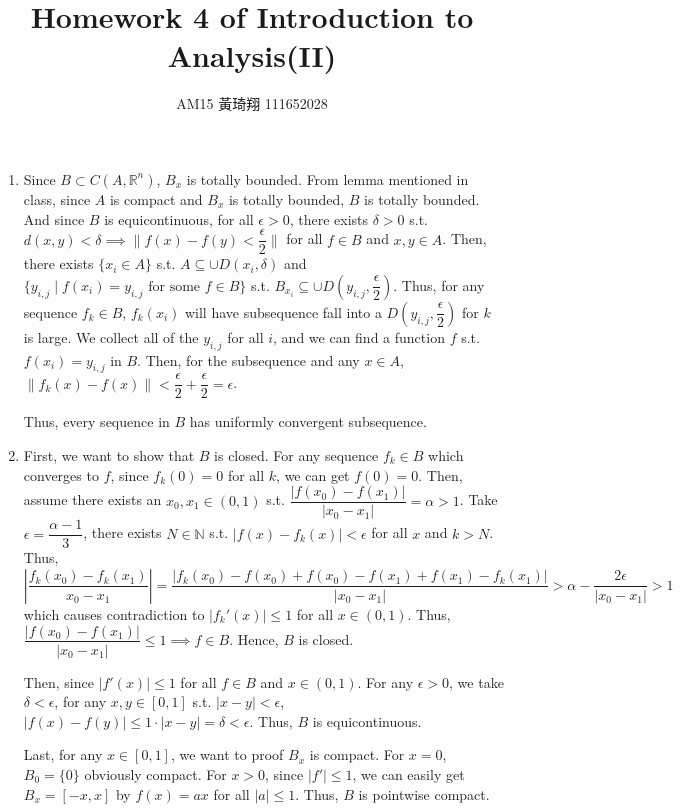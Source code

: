 \documentclass[12pt]{article}
\title{Homework 4 of Introduction to Analysis(II)}
\author{AM15 黃琦翔 111652028}
\begin{document}
\maketitle
\begin{enumerate}
    \item Since $B \subset C(A, \mathbb{R}^n)$, $B_x$ is totally bounded.
    From lemma mentioned in class, since $A$ is compact and $B_x$ is totally bounded, $B$ is totally bounded.
    And since $B$ is equicontinuous, for all $\epsilon> 0$, there exists $\delta > 0$ s.t. $d(x, y) < \delta\implies \| f(x) - f(y) < \dfrac{\epsilon}{2}\|$ for all $f\in B$ and $x, y \in A$.
    Then, there exists $\{ x_i\in A\}$ s.t. $A\subseteq \cup D(x_i, \delta)$
    and $\{ y_{i, j}\mid f(x_i) = y_{i, j}\text{ for some } f\in B\}$ s.t. $B_{x_i} \subseteq \cup D(y_{i, j}, \dfrac{\epsilon}{2})$.
    Thus, for any sequence $f_k \in B$, $f_k(x_i)$ will have subsequence fall into a $D(y_{i, j}, \dfrac{\epsilon}{2})$ for $k$ is large.
    We collect all of the $y_{i, j}$ for all $i$, and we can find a function $f$ s.t. $f(x_i) = y_{i, j}$ in $B$.
    Then, for the subsequence and any $x\in A$, $\| f_k(x) - f(x)\| < \dfrac{\epsilon}{2} + \dfrac{\epsilon}{2} = \epsilon$.

    Thus, every sequence in $B$ has uniformly convergent subsequence.

    \item First, we want to show that $B$ is closed.
    For any sequence $f_k \in B$ which converges to $f$, 
    since $f_k(0) = 0$ for all $k$, we can get $f(0) = 0$.
    Then, assume there exists an $x_0, x_1 \in (0, 1)$ s.t. $\dfrac{|f(x_0) - f(x_1)|}{|x_0 - x_1|} = \alpha > 1$.
    Take $\epsilon = \dfrac{\alpha-1}{3}$, there exists $N \in \mathbb{N}$ s.t. $|f(x) - f_k(x)| < \epsilon$ for all $x$ and $k > N$.
    Thus, $|\dfrac{f_k(x_0) - f_k(x_1)}{x_0 - x_1}| = \dfrac{|f_k(x_0) - f(x_0) + f(x_0) - f(x_1) + f(x_1) - f_k(x_1)|}{|x_0 - x_1|} > \alpha - \dfrac{2\epsilon}{|x_0 - x_1|} > 1$ 
    which causes contradiction to $|f_k'(x)| \leq 1$ for all $x\in (0, 1)$.
    Thus, $\dfrac{|f(x_0) - f(x_1)|}{|x_0 - x_1|} \leq 1\implies f\in B$.
    Hence, $B$ is closed.
    
    Then, since $|f'(x)| \leq 1$ for all $f\in B$ and $x\in (0, 1)$.
    For any $\epsilon > 0$, we take $\delta < \epsilon$,
    for any $x, y \in [0, 1]$ s.t. $|x - y| < \epsilon$, 
    $|f(x) - f(y)| \leq 1 \cdot |x-y| = \delta < \epsilon$.
    Thus, $B$ is equicontinuous.

    Last, for any $x \in [0, 1]$, we want to proof $B_x$ is compact.
    For $x = 0$, $B_0 = \{ 0\}$ obviously compact.
    For $x > 0$, since $|f'|\leq 1$, we can easily get $B_x = [-x, x]$ by $f(x) = ax$ for all $|a| \leq 1$.
    Thus, $B$ is pointwise compact.


\end{enumerate}
\end{document}
